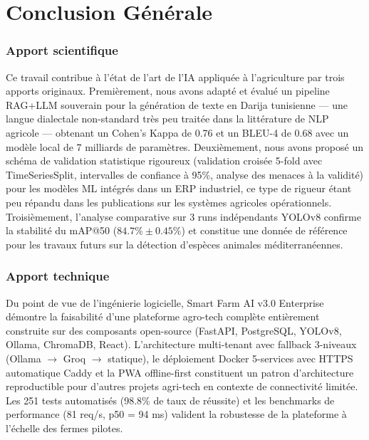 \chapter*{Conclusion Générale}

\subsection*{Apport scientifique}
Ce travail contribue à l'état de l'art de l'IA appliquée à l'agriculture
par trois apports originaux. Premièrement, nous avons adapté et évalué
un pipeline RAG+LLM souverain pour la génération de texte en Darija
tunisienne — une langue dialectale non-standard très peu traitée dans
la littérature de NLP agricole — obtenant un Cohen's Kappa de 0.76 et
un BLEU-4 de 0.68 avec un modèle local de 7 milliards de paramètres.
Deuxièmement, nous avons proposé un schéma de validation statistique
rigoureux (validation croisée 5-fold avec TimeSeriesSplit, intervalles
de confiance à 95\%, analyse des menaces à la validité) pour les modèles
ML intégrés dans un ERP industriel, ce type de rigueur étant peu répandu
dans les publications sur les systèmes agricoles opérationnels. Troisièmement,
l'analyse comparative sur 3 runs indépendants YOLOv8 confirme la stabilité
du mAP@50 ($84.7\% \pm 0.45\%$) et constitue une donnée de référence pour
les travaux futurs sur la détection d'espèces animales méditerranéennes.

\subsection*{Apport technique}
Du point de vue de l'ingénierie logicielle, Smart Farm AI v3.0 Enterprise
démontre la faisabilité d'une plateforme agro-tech complète entièrement
construite sur des composants open-source (FastAPI, PostgreSQL, YOLOv8,
Ollama, ChromaDB, React). L'architecture multi-tenant avec fallback
3-niveaux (Ollama $\rightarrow$ Groq $\rightarrow$ statique), le déploiement Docker 5-services
avec HTTPS automatique Caddy et la PWA offline-first constituent un patron
d'architecture reproductible pour d'autres projets agri-tech en contexte
de connectivité limitée. Les 251 tests automatisés (98.8\% de taux de
réussite) et les benchmarks de performance (81 req/s, p50 = 94 ms) valident
la robustesse de la plateforme à l'échelle des fermes pilotes.

